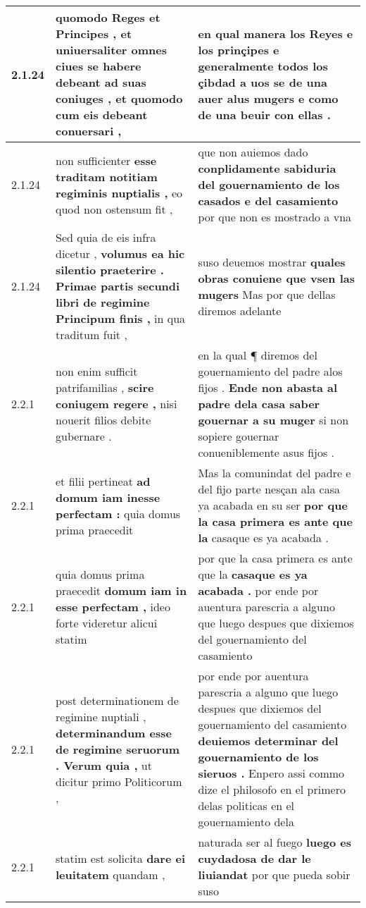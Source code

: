 \begin{tabular}{|p{1cm}|p{6.5cm}|p{6.5cm}|}
2.1.24 & quomodo Reges et Principes , \textbf{ et uniuersaliter omnes ciues se habere debeant ad suas coniuges , } et quomodo cum eis debeant conuersari , & en qual manera los Reyes e los prinçipes \textbf{ e generalmente todos los çibdad a uos se de una auer alus mugers } e como de una beuir con ellas . \\\hline
2.1.24 & non sufficienter \textbf{ esse traditam notitiam regiminis nuptialis , } eo quod non ostensum fit , & que non auiemos dado \textbf{ conplidamente sabiduria del gouernamiento de los casados e del casamiento } por que non es mostrado a vna \\\hline
2.1.24 & Sed quia de eis infra dicetur , \textbf{ volumus ea hic silentio praeterire . Primae partis secundi libri de regimine Principum finis , } in qua traditum fuit , & suso deuemos mostrar \textbf{ quales obras conuiene que vsen las mugers } Mas por que dellas diremos adelante \\\hline
2.2.1 & non enim sufficit patrifamilias , \textbf{ scire coniugem regere , } nisi nouerit filios debite gubernare . & en la qual ¶ diremos del gouernamiento del padre alos fijos . \textbf{ Ende non abasta al padre dela casa saber gouernar a su muger } si non sopiere gouernar conueniblemente asus fijos . \\\hline
2.2.1 & et filii pertineat \textbf{ ad domum iam inesse perfectam : } quia domus prima praecedit & Mas la comunindat del padre e del fijo parte nesçan ala casa ya acabada en su ser \textbf{ por que la casa primera es ante que la } casaque es ya acabada . \\\hline
2.2.1 & quia domus prima praecedit \textbf{ domum iam in esse perfectam , } ideo forte videretur alicui statim & por que la casa primera es ante que la \textbf{ casaque es ya acabada . } por ende por auentura parescria a alguno que luego despues que dixiemos del gouernamiento del casamiento \\\hline
2.2.1 & post determinationem de regimine nuptiali , \textbf{ determinandum esse de regimine seruorum . Verum quia , } ut dicitur primo Politicorum , & por ende por auentura parescria a alguno que luego despues que dixiemos del gouernamiento del casamiento \textbf{ deuiemos determinar del gouernamiento de los sieruos . } Enpero assi commo dize el philosofo en el primero delas politicas en el gouernamiento dela \\\hline
2.2.1 & statim est solicita \textbf{ dare ei leuitatem } quandam , & naturada ser al fuego \textbf{ luego es cuydadosa de dar le liuiandat } por que pueda sobir suso \\\hline

\end{tabular}
